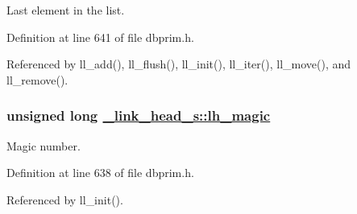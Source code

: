 Last element in the list. 

Definition at line 641 of file dbprim.h.

Referenced by ll\_\-add(), ll\_\-flush(), ll\_\-init(), ll\_\-iter(), ll\_\-move(), and ll\_\-remove().\hypertarget{struct__link__head__s_o0}{
\subsubsection[lh\_\-magic]{\setlength{\rightskip}{0pt plus 5cm}unsigned long \hyperlink{struct__link__head__s_o0}{\_\-link\_\-head\_\-s::lh\_\-magic}}}
\label{struct__link__head__s_o0}


Magic number. 

Definition at line 638 of file dbprim.h.

Referenced by ll\_\-init().